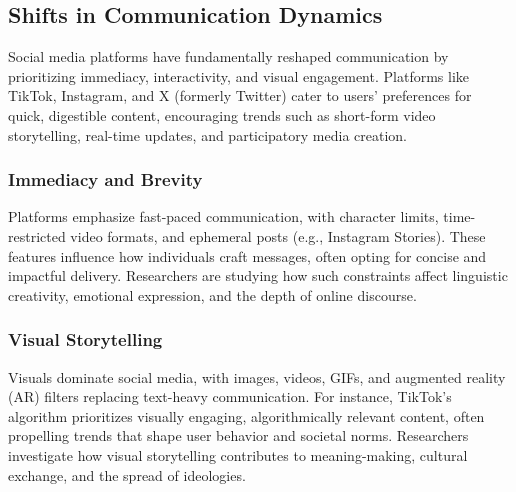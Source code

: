 \documentclass[
]{book}
\begin{document}
\subsection*{Shifts in Communication Dynamics}\label{shifts-in-communication-dynamics}

Social media platforms have fundamentally reshaped communication by prioritizing immediacy, interactivity, and visual engagement. Platforms like TikTok, Instagram, and X (formerly Twitter) cater to users' preferences for quick, digestible content, encouraging trends such as short-form video storytelling, real-time updates, and participatory media creation.

\subsubsection*{Immediacy and Brevity}\label{immediacy-and-brevity}

Platforms emphasize fast-paced communication, with character limits, time-restricted video formats, and ephemeral posts (e.g., Instagram Stories). These features influence how individuals craft messages, often opting for concise and impactful delivery. Researchers are studying how such constraints affect linguistic creativity, emotional expression, and the depth of online discourse.

\subsubsection*{Visual Storytelling}\label{visual-storytelling}

Visuals dominate social media, with images, videos, GIFs, and augmented reality (AR) filters replacing text-heavy communication. For instance, TikTok's algorithm prioritizes visually engaging, algorithmically relevant content, often propelling trends that shape user behavior and societal norms. Researchers investigate how visual storytelling contributes to meaning-making, cultural exchange, and the spread of ideologies.
\end{document}
